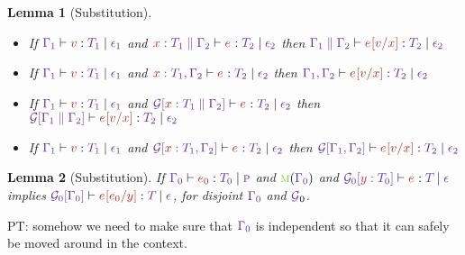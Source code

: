 \documentclass{article}
\newtheorem{lemma}{Lemma}
\begin{document}
\begin{lemma}[Substitution]\
  \begin{itemize}
    \item If $\HasType {\Ctx[1]} {\V} {\T[1]} {\Eff[1]}$ and
    $\HasType {\CtxExtUnord{\CtxVar x{\T[1]}}{\Ctx[2]}} {\E} {\T[2]} {\Eff[2]}$
    then 
    $\HasType {\CtxExtUnord{\Ctx[1]}{\Ctx[2]}} {\Subs\E\V x} {\T[2]} {\Eff[2]}$
    \item If $\HasType {\Ctx[1]} {\V} {\T[1]} {\Eff[1]}$ and
    $\HasType {\CtxExt{\CtxVar x{\T[1]}}{\Ctx[2]}} {\E} {\T[2]} {\Eff[2]}$
    then 
    $\HasType {\CtxExt{\Ctx[1]}{\Ctx[2]}} {\Subs\E\V x} {\T[2]} {\Eff[2]}$
    \item If $\HasType {\Ctx[1]} {\V} {\T[1]} {\Eff[1]}$
    and
    $\HasType
    {\CtxPattern{\CtxExtUnord{\CtxVar x{\T[1]}}{\Ctx[2]}}}
    {\E}
    {\T[2]}
    {\Eff[2]}$ then 
    $\HasType {\CtxPattern{\CtxExtUnord{\Ctx[1]}{\Ctx[2]}}} {\Subs\E\V x} {\T[2]} {\Eff[2]}$
  \item If $\HasType {\Ctx[1]} {\V} {\T[1]} {\Eff[1]}$
    and
    $\HasType
    {\CtxPattern{\CtxExt{\CtxVar x{\T[1]}}{\Ctx[2]}}}
    {\E}
    {\T[2]}
    {\Eff[2]}$ then 
    $\HasType {\CtxPattern{\CtxExt{\Ctx[1]}{\Ctx[2]}}} {\Subs\E\V x} {\T[2]} {\Eff[2]}$
  \end{itemize}
\end{lemma}
\begin{lemma}[Substitution]
  \label{lem:substitution}
  If 
  $\HasType {\Ctx[0]} {\E[0]} {\T[0]} {\EffPure}$
  and
  $\MobMobile (\Ctx[0])$
  and
  $\HasType
    {\CtxPattern[0]{\CtxVar y{\T[0]}}}
    {\E}
    {\T}
    {\Eff}$
    implies
    $\HasType {\CtxPattern[0]{{\Ctx[0]}}} {\Subs\E{\E[0]} y} {\T}
    {\Eff}$, for disjoint $\Ctx[0]$ and $\CtxPatternRaw_0$.
  \end{lemma}
  PT: somehow we need to make sure that $\Ctx[0]$ is independent so
  that it can safely be moved around in the context.
\end{document}
